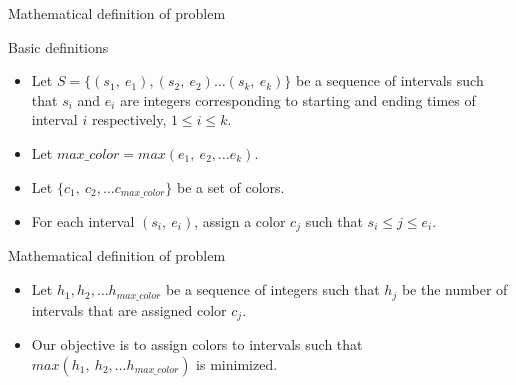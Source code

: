 \begin{frame}{Mathematical definition of problem}
\begin{block}{Basic definitions}
\begin{itemize}
\item Let $S =\{(s_1,\ e_1), (s_2,\ e_2)\ldots (s_k,\ e_k)\}$ be a sequence of intervals such that $s_i$ and $e_i$ are 
integers corresponding to starting and ending times of interval $i$ respectively, $1 \le i \le k$.
\item Let $max\_color = max(e_1,\ e_2, \ldots e_k)$.
\item Let $\{c_1,\ c_2, \ldots c_{max\_color}\}$ be a set of colors.
\item For each interval $(s_i,\ e_i)$, assign a color $c_j$ such that $s_i \le j \le e_i$.
\end{itemize}
\end{block}

\begin{block}{Mathematical definition of problem}
\begin{itemize}
\item Let $h_1, h_2, \ldots h_{max\_color}$ be a sequence of integers such that $h_j$ be the number of intervals that are assigned color $c_j$.
\item Our objective is to assign colors to intervals such that $max(h_1,\ h_2, \ldots h_{max\_color})$ is minimized.
\end{itemize}
\end{block}

\end{frame}

